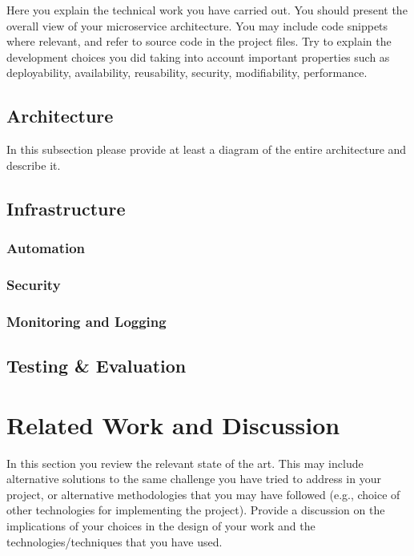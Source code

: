\documentclass[a4paper,12pt]{article}
\begin{document}
Here you explain the technical work you have carried out. You should present the
overall view of your microservice architecture. You may include code
snippets where relevant, and refer to source code in the project files. Try to
explain the development choices you did taking into account important properties
such as deployability, availability, reusability, security, modifiability,
performance.

\subsection{Architecture}
  
In this subsection please provide at least a diagram of the entire 
architecture and describe it.

\subsection{Infrastructure}

\subsubsection{Automation}

\subsubsection{Security}
    
\subsubsection{Monitoring and Logging} 
    
\subsection{Testing \& Evaluation}

\section{Related Work and Discussion}

In this section you review the relevant state of the art. This may include
alternative solutions to the same challenge you have tried to address in your
project, or alternative methodologies that you may have followed (e.g., choice
of other technologies for implementing the project). Provide a discussion on the
implications of your choices in the design of your work and the
technologies/techniques that you have used.
\end{document}
